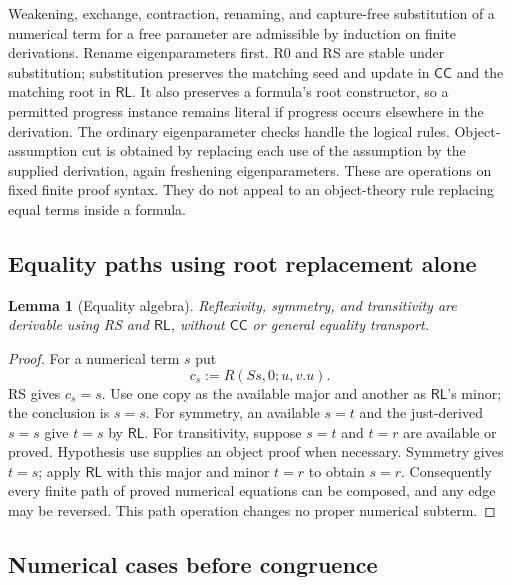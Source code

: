 \documentclass[11pt,letterpaper]{article}
\newtheorem{lemma}[theorem]{Lemma}
\theoremstyle{definition}\newtheorem{definition}[theorem]{Definition}
\theoremstyle{remark}\newtheorem{remark}[theorem]{Remark}
\begin{document}
Weakening, exchange, contraction, renaming, and capture-free substitution
of a numerical term for a free parameter are admissible by induction on
finite derivations. Rename eigenparameters first. R0 and RS are stable
under substitution; substitution preserves the matching seed and update
in $\mathsf{CC}$ and the matching root in $\mathsf{RL}$. It also
preserves a formula's root constructor, so a permitted progress instance
remains literal if progress occurs elsewhere in the derivation.
The ordinary eigenparameter checks handle the logical rules.
Object-assumption cut is obtained by replacing each use of the assumption
by the supplied derivation, again freshening eigenparameters.
These are operations on fixed finite proof syntax. They do not appeal
to an object-theory rule replacing equal terms inside a formula.

\subsection{Equality paths using root replacement alone}

\begin{lemma}[Equality algebra]
\label{ctr:equality-algebra}
Reflexivity, symmetry, and transitivity are derivable using RS and
$\mathsf{RL}$, without $\mathsf{CC}$ or general equality transport.
\end{lemma}
\begin{proof}
For a numerical term $s$ put
\[
             c_s:=R(Ss,0;u,v.u).
\]
RS gives $c_s=s$. Use one copy as the available major and another as
$\mathsf{RL}$'s minor; the conclusion is $s=s$.
For symmetry, an available $s=t$ and the just-derived $s=s$ give
$t=s$ by $\mathsf{RL}$.
For transitivity, suppose $s=t$ and $t=r$ are available or proved.
Hypothesis use supplies an object proof when necessary. Symmetry gives
$t=s$; apply $\mathsf{RL}$ with this major and minor $t=r$ to obtain
$s=r$. Consequently every finite path of proved numerical equations
can be composed, and any edge may be reversed. This path operation
changes no proper numerical subterm.
\end{proof}

\subsection{Numerical cases before congruence}
\end{document}
